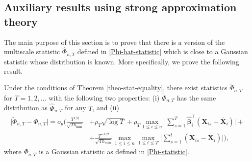 \documentclass[a4paper,12pt]{article}
\begin{document}
\subsection*{Auxiliary results using strong approximation theory}


The main purpose of this section is to prove that there is a version of the multiscale statistic $\widehat{\Phi}_{n,T}$ defined in \eqref{Phi-hat-statistic} which is close to a Gaussian statistic whose distribution is known. More specifically, we prove the following result. 
\begin{propA}\label{propA-strong-approx-equality}
Under the conditions of Theorem \ref{theo-stat-equality}, there exist statistics $\widetilde{\Phi}_{n,T}$ for $T = 1,2,\ldots$ with the following two properties: (i) $\widetilde{\Phi}_{n, T}$ has the same distribution as $\widehat{\Phi}_{n, T}$ for any $T$, and (ii)
\begin{align*}
\big| \widetilde{\Phi}_{n, T} - \Phi_{n,T} \big| = o_p \Big( \frac{T^{1/q}}{\sqrt{T h_{\min}}} &+ \rho_T \sqrt{\log T} + \rho_T\max_{1\le i\le n} \Big|\sum\limits_{s=1}^T \widehat{\bm{\beta}}_i^\top(\mathbf{X}_{is} - \bar{\mathbf{X}}_{i} )\Big| +\\
&+ \frac{T^{-1/2}}{\sqrt{Th_{min}}} \max_{1 \le i \le n}\max_{1\le t \le T}\Big|\sum\limits_{s=1}^t (\mathbf{X}_{is} - \bar{\mathbf{X}}_{i} )\Big|  \Big),
\end{align*}
where $\Phi_{n,T}$ is a Gaussian statistic as defined in \eqref{Phi-statistic}. 
\end{propA}
\end{document}
